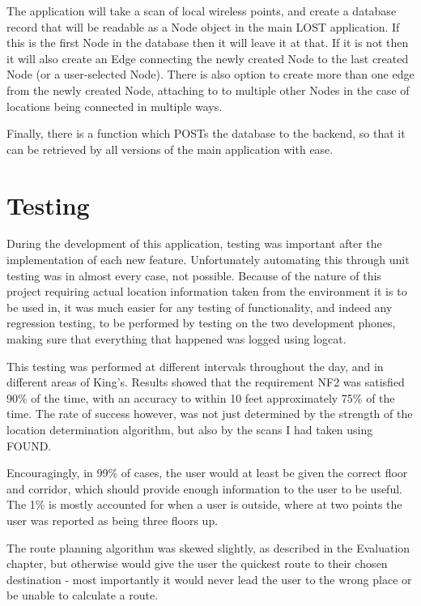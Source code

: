 \documentclass[11pt]{informatics-report}
\begin{document}
The application will take a scan of local wireless points, and create a database record that will be readable as a Node object in the main LOST application. If this is the first Node in the database then it will leave it at that. If it is not then it will also create an Edge connecting the newly created Node to the last created Node (or a user-selected Node). There is also option to create more than one edge from the newly created Node, attaching to to multiple other Nodes in the case of locations being connected in multiple ways.

Finally, there is a function which POSTs the database to the backend, so that it can be retrieved by all versions of the main application with ease.

\section{Testing}

During the development of this application, testing was important after the implementation of each new feature. Unfortunately automating this through unit testing was in almost every case, not possible. Because of the nature of this project requiring actual location information taken from the environment it is to be used in, it was much easier for any testing of functionality, and indeed any regression testing, to be performed by testing on the two development phones, making sure that everything that happened was logged using logcat.

This testing was performed at different intervals throughout the day, and in different areas of King's. Results showed that the requirement NF2 was satisfied 90\% of the time, with an accuracy to within 10 feet approximately 75\% of the time. The rate of success however, was not just determined by the strength of the location determination algorithm, but also by the scans I had taken using FOUND. 

Encouragingly, in 99\% of cases, the user would at least be given the correct floor and corridor, which should provide enough information to the user to be useful. The 1\% is mostly accounted for when a user is outside, where at two points the user was reported as being three floors up.

The route planning algorithm was skewed slightly, as described in the Evaluation chapter, but otherwise would give the user the quickest route to their chosen destination - most importantly it would never lead the user to the wrong place or be unable to calculate a route. 
\end{document}
